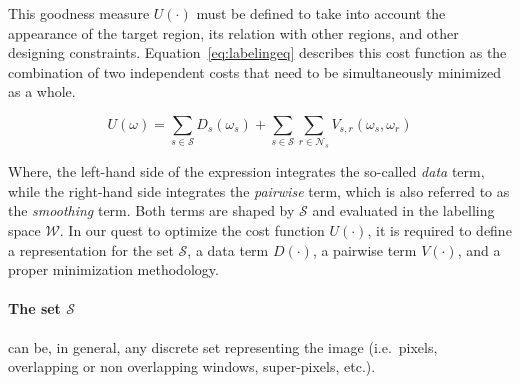 
This goodness measure $U(\cdot)$ must be defined to take into account the appearance of the target region, its relation with other regions, and other designing constraints.
Equation~\eqref{eq:labelingeq} describes this cost function as the combination of two independent costs that need to be simultaneously minimized as a whole.

\begin{equation}
  U(\omega) = \sum_{s\in \mathcal{S}} D_s(\omega_s) + \sum_{s \in \mathcal{S}}\sum_{r \in \mathcal{N}_{s}} V_{s,r}(\omega_s,\omega_r)
  \label{eq:labelingeq}
\end{equation}

Where, the left-hand side of the expression integrates the so-called \emph{data} term, while the right-hand side integrates the \emph{pairwise} term, which is also referred to as the \emph{smoothing} term.
Both terms are shaped by $\mathcal{S}$ and evaluated in the labelling space $\mathcal{W}$.
%
In our quest to optimize the cost function $U(\cdot)$, it is required to define a representation for the set $\mathcal{S}$, a data term $D(\cdot)$, a pairwise term $V(\cdot)$, and a proper minimization methodology.

\paragraph{The set $\mathcal{S}$}
can be, in general, any discrete set representing the image (i.e.\, pixels, overlapping or non overlapping windows, super-pixels, etc.).

